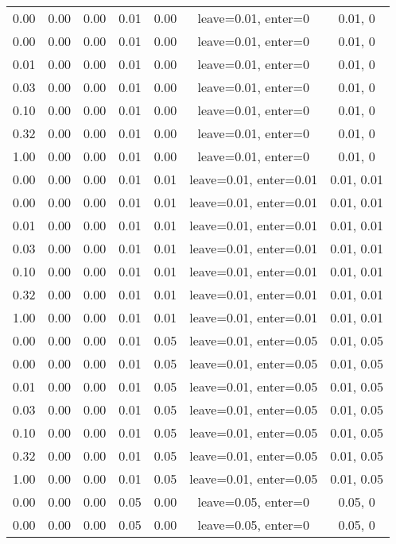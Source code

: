 \begin{table}[ht]
\begin{table}[ht]
\begin{tabular}{|ccccccc}
  0.00 & 0.00 & 0.00 & 0.01 & 0.00 & leave=0.01, enter=0 & 0.01, 0 \\ 
  0.00 & 0.00 & 0.00 & 0.01 & 0.00 & leave=0.01, enter=0 & 0.01, 0 \\ 
  0.01 & 0.00 & 0.00 & 0.01 & 0.00 & leave=0.01, enter=0 & 0.01, 0 \\ 
  0.03 & 0.00 & 0.00 & 0.01 & 0.00 & leave=0.01, enter=0 & 0.01, 0 \\ 
  0.10 & 0.00 & 0.00 & 0.01 & 0.00 & leave=0.01, enter=0 & 0.01, 0 \\ 
  0.32 & 0.00 & 0.00 & 0.01 & 0.00 & leave=0.01, enter=0 & 0.01, 0 \\ 
  1.00 & 0.00 & 0.00 & 0.01 & 0.00 & leave=0.01, enter=0 & 0.01, 0 \\ 
  0.00 & 0.00 & 0.00 & 0.01 & 0.01 & leave=0.01, enter=0.01 & 0.01, 0.01 \\ 
  0.00 & 0.00 & 0.00 & 0.01 & 0.01 & leave=0.01, enter=0.01 & 0.01, 0.01 \\ 
  0.01 & 0.00 & 0.00 & 0.01 & 0.01 & leave=0.01, enter=0.01 & 0.01, 0.01 \\ 
  0.03 & 0.00 & 0.00 & 0.01 & 0.01 & leave=0.01, enter=0.01 & 0.01, 0.01 \\ 
  0.10 & 0.00 & 0.00 & 0.01 & 0.01 & leave=0.01, enter=0.01 & 0.01, 0.01 \\ 
  0.32 & 0.00 & 0.00 & 0.01 & 0.01 & leave=0.01, enter=0.01 & 0.01, 0.01 \\ 
  1.00 & 0.00 & 0.00 & 0.01 & 0.01 & leave=0.01, enter=0.01 & 0.01, 0.01 \\ 
  0.00 & 0.00 & 0.00 & 0.01 & 0.05 & leave=0.01, enter=0.05 & 0.01, 0.05 \\ 
  0.00 & 0.00 & 0.00 & 0.01 & 0.05 & leave=0.01, enter=0.05 & 0.01, 0.05 \\ 
  0.01 & 0.00 & 0.00 & 0.01 & 0.05 & leave=0.01, enter=0.05 & 0.01, 0.05 \\ 
  0.03 & 0.00 & 0.00 & 0.01 & 0.05 & leave=0.01, enter=0.05 & 0.01, 0.05 \\ 
  0.10 & 0.00 & 0.00 & 0.01 & 0.05 & leave=0.01, enter=0.05 & 0.01, 0.05 \\ 
  0.32 & 0.00 & 0.00 & 0.01 & 0.05 & leave=0.01, enter=0.05 & 0.01, 0.05 \\ 
  1.00 & 0.00 & 0.00 & 0.01 & 0.05 & leave=0.01, enter=0.05 & 0.01, 0.05 \\ 
  0.00 & 0.00 & 0.00 & 0.05 & 0.00 & leave=0.05, enter=0 & 0.05, 0 \\ 
  0.00 & 0.00 & 0.00 & 0.05 & 0.00 & leave=0.05, enter=0 & 0.05, 0 \\ 

\end{tabular}
\end{table}
\end{table}
